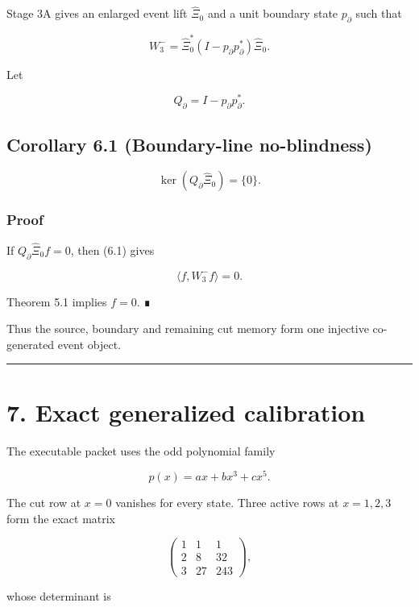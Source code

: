 Stage 3A gives an enlarged event lift \(\widehat\Xi_0\) and a unit boundary
state \(p_\partial\) such that

\[
W_3^-
=
\widehat\Xi_0^*
(I-p_\partial p_\partial^*)
\widehat\Xi_0.
\tag{6.1}
\]

Let

\[
Q_\partial=I-p_\partial p_\partial^*.
\]

\hypertarget{corollary-6.1-boundary-line-no-blindness}{%
\subsection{Corollary 6.1 (Boundary-line no-blindness)}\label{corollary-6.1-boundary-line-no-blindness}}

\[
\boxed{
\ker(Q_\partial\widehat\Xi_0)=\{0\}.
}
\tag{6.2}
\]

\hypertarget{proof-4}{%
\subsubsection{Proof}\label{proof-4}}

If \(Q_\partial\widehat\Xi_0f=0\), then (6.1) gives

\[
\langle f,W_3^-f\rangle=0.
\]

Theorem 5.1 implies \(f=0\). ∎

Thus the source, boundary and remaining cut memory form one injective
co-generated event object.

\begin{center}\rule{0.5\linewidth}{0.5pt}\end{center}

\hypertarget{exact-generalized-calibration}{%
\section{7. Exact generalized calibration}\label{exact-generalized-calibration}}

The executable packet uses the odd polynomial family

\[
p(x)=a x+b x^3+c x^5.
\]

The cut row at \(x=0\) vanishes for every state. Three active rows at
\(x=1,2,3\) form the exact matrix

\[
\begin{pmatrix}
1&1&1\\
2&8&32\\
3&27&243
\end{pmatrix},
\]

whose determinant is

